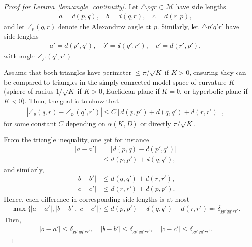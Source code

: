 \begin{proof}[Proof for Lemma~\ref{lem:angle_continuity}]
    Let $\triangle pqr \subset \mathcal{M}$ have side lengths
    \begin{align*}
        a = d(p, q), \quad b = d(q, r), \quad c = d(r,p),
    \end{align*}
    and let $\angle_p(q, r)$ denote the Alexandrov angle at $p$.
    Similarly, let $\triangle p'q'r'$ have side lengths
    \begin{align*}
        a' = d(p', q'), \quad b' = d(q', r'), \quad c' = d(r',p'),
    \end{align*}
    with angle $\angle_{p'}(q', r')$.

    Assume that both triangles have perimeter $\leq \pi / \sqrt{K}$ if $K > 0$, ensuring they can be compared to triangles in the simply connected model space of curvature $K$ (sphere of radius $1 / \sqrt{K}$ if $K > 0$, Euclidean plane if $K = 0$, or hyperbolic plane if $K < 0$).
    Then, the goal is to show that
    \begin{align*}
        \left|\angle_p(q, r) - \angle_{p'}(q', r') \right| \leq C\left[d(p, p') + d(q, q') + d(r, r') \right],
    \end{align*}
    for some constant $C$ depending on $\alpha(K, D)$ or directly $\pi / \sqrt{K}$.

    From the triangle inequality, one get for instance
    \begin{align*}
        |a - a'| &= |d(p, q) - d(p', q')| \\
        &\leq d(p, p') + d(q, q'),
    \end{align*}
    and similarly,
    \begin{align*}
        |b - b'| &\leq d(q, q') + d(r, r'), \\
        |c - c'| &\leq d(r, r') + d(p, p').
    \end{align*}
    Hence, each difference in corresponding side lengths is at most
    \begin{align*}
        \max\{|a - a'|, |b - b'|, |c - c'|\} \leq d(p, p') + d(q, q') + d(r, r') \eqcolon \delta_{pp'qq'rr'}.
    \end{align*}
    Then,
    \begin{align*}
        |a - a'| \leq \delta_{pp'qq'rr'}, \quad |b - b'| \leq \delta_{pp'qq'rr'}, \quad |c - c'| \leq \delta_{pp'qq'rr'}.
    \end{align*}


\end{proof}
